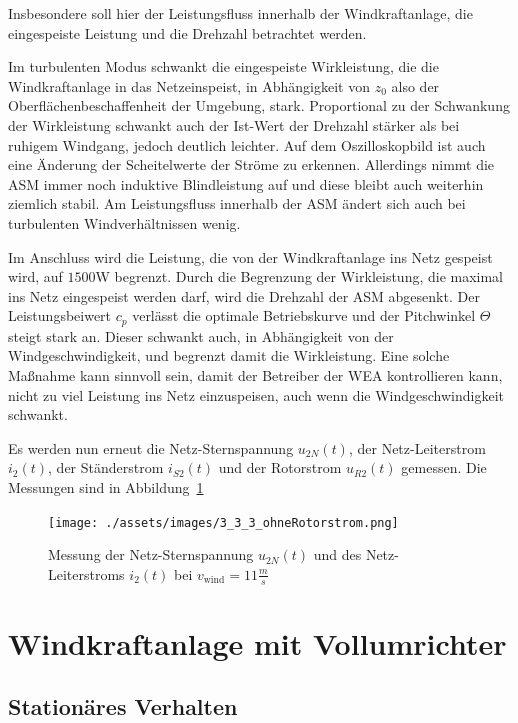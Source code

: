\documentclass{report}
\begin{document}
Insbesondere soll hier der Leistungsfluss innerhalb der Windkraftanlage, die eingespeiste Leistung und die Drehzahl betrachtet werden.

Im turbulenten Modus schwankt die eingespeiste Wirkleistung, die die Windkraftanlage in das Netzeinspeist, in Abhängigkeit von $z_{0}$ also der Oberflächenbeschaffenheit der Umgebung, stark. Proportional zu der Schwankung der Wirkleistung schwankt auch der Ist-Wert der Drehzahl stärker als bei ruhigem Windgang, jedoch deutlich leichter. Auf dem Oszilloskopbild ist auch eine Änderung der Scheitelwerte der Ströme zu erkennen. Allerdings nimmt die ASM immer noch induktive Blindleistung auf und diese bleibt auch weiterhin ziemlich stabil. Am Leistungsfluss innerhalb der ASM ändert sich auch bei turbulenten Windverhältnissen wenig.

Im Anschluss wird die Leistung, die von der Windkraftanlage ins Netz gespeist wird, auf $1500$W begrenzt. Durch die Begrenzung der Wirkleistung, die maximal ins Netz eingespeist werden darf, wird die Drehzahl der ASM abgesenkt. Der Leistungsbeiwert $c_{p}$ verlässt die optimale Betriebskurve und der Pitchwinkel $\Theta$ steigt stark an. Dieser schwankt auch, in Abhängigkeit von der Windgeschwindigkeit, und begrenzt damit die Wirkleistung. Eine solche Maßnahme kann sinnvoll sein, damit der Betreiber der WEA kontrollieren kann, nicht zu viel Leistung ins Netz einzuspeisen, auch wenn die Windgeschwindigkeit schwankt.


Es werden nun erneut die Netz-Sternspannung $u_{2N}(t)$, der Netz-Leiterstrom $i_{2}(t)$, der Ständerstrom $i_{S2}(t)$ und der Rotorstrom $u_{R2}(t)$ gemessen. Die Messungen sind in Abbildung~\ref{fig:oszi_direkt_dynamisch}

\begin{figure}[!ht]
	\centering
	\texttt{[image: ./assets/images/3\_3\_3\_ohneRotorstrom.png]}
	\caption{Messung der Netz-Sternspannung $u_{2N}(t)$ und des Netz-Leiterstroms $i_{2}(t)$ bei $v_{\mathrm{wind}} = 11 \frac{m}{s}$}
	\label{fig:oszi_direkt_dynamisch}
\end{figure}

\section{Windkraftanlage mit Vollumrichter}

\subsection{Stationäres Verhalten}
\label{subsec:stat-voll}
\end{document}
